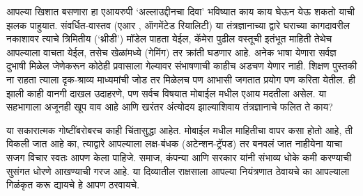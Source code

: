 आपल्या खिशात बसणारा हा एआयरुपी `अल्लाउद्दीनचा दिवा' भविष्यात काय काय घेऊन येऊ शकतो याची झलक पाहुयात. संवर्धित-वास्तव (एआर , ऑगमेंटेड रियालिटी) या तंत्रज्ञानाच्या द्वारे घराच्या कागदावरील नकाशावर त्याचे त्रिमितीय (`थ्रीडी') मॉडेल पाहता येईल, कॅमेरा पुढील वस्तूची इतंभूत माहिती तेथेच आपल्याला वाचता येईल, तसेच खेळांमध्ये (गेमिंग) तर क्रांती घडणार आहे. अनेक भाषा येणारा सर्वज्ञ दुभाषी मिळेल जेणेकरून कोठेही प्रवासाला गेल्यावर संभाषणाची काहीच अडचण येणार नाही. शिक्षण पुस्तकी ना राहता त्याला दृक-श्राव्य माध्यमांची जोड तर मिळेलच पण आभासी जगतात प्रयोग पण करिता येतील. ही झाली काही वानगी दाखल उदाहरणे, पण सर्वच विषयात मोबाईल मधील एआय मदतीला असेल. या सहभागाला अजूनही खूप वाव आहे आणि खरंतर अंत्योदय झाल्याशिवाय तंत्रज्ञानाचे फलित ते काय?

या सकारात्मक गोष्टींबरोबरच काही चिंतासुद्धा आहेत. मोबाईल मधील माहितीचा वापर कसा होतो आहे, ती विकली जात आहे का, त्याद्वारे आपल्याला लक्ष-बंधक (अटेन्शन-ट्रॅपड) तर बनवलं जात नाहीयेना याचा सजग विचार स्वतः आपण केला पाहिजे. समाज, कंपन्या आणि सरकार यांनी संभाव्य धोके कमी करण्याची सुसंगत धोरणे आखण्याची गरज आहे. या दिव्यातील राक्षसाला आपल्या नियंत्रणात ठेवायचे का आपल्याला गिळंकृत करू द्यायचे हे आपण ठरवायचे.